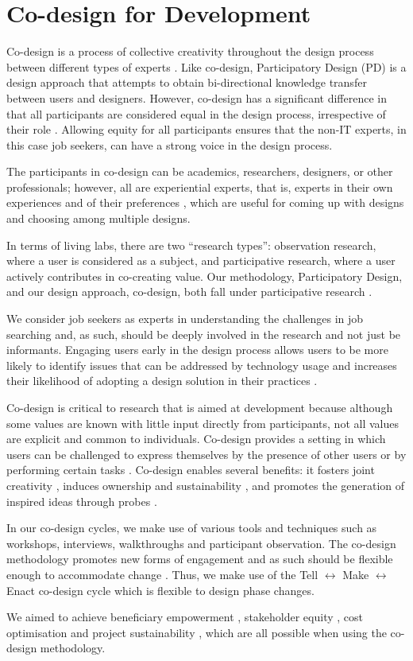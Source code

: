 \section{Co-design for Development}

Co-design is a process of collective creativity throughout the design process
\cite{sanders2008} between different types of experts \cite{steen2011}.
Like co-design, Participatory Design (PD) is a design approach that attempts to obtain
bi-directional knowledge transfer between users and designers. However, co-design has a
significant difference in that all participants are considered equal in the design process,
irrespective of their role \cite{zimmerman2011}. Allowing equity for all participants
ensures that the non-IT experts, in this case job seekers, can have a strong voice in the
design process.

The participants in co-design can be academics, researchers, designers, or other
professionals; however, all are experiential experts, that is, experts in their own
experiences \cite{steen2011} and of their preferences \cite{preece2002}, which are
useful for coming up with designs and choosing among multiple designs.

In terms of living labs, there are two ``research types'': observation research, where a
user is considered as a subject, and participative research, where a user actively contributes
in co-creating value. Our methodology, Participatory Design, and our design approach,
co-design, both fall under participative research \cite{pallot2011}.

We consider job seekers as experts in understanding the challenges in job searching
and, as such, should be deeply involved in the research and not just be informants.
Engaging users early in the design process allows users to be more likely to identify issues
that can be addressed by technology usage and increases their likelihood of adopting a design
solution in their practices \cite{david2013}.

Co-design is critical to research that is aimed at development because although
some values are known with little input directly from participants, not all values are
explicit and common to individuals. Co-design provides a setting in which users
can be challenged to express themselves by the presence of other users or by performing certain tasks \cite{halloran2009}. Co-design enables several benefits: it fosters joint
creativity \cite{steen2011}, induces ownership and sustainability \cite{david2013},
and promotes the generation of inspired ideas through probes
\cite{sanders2014}.

In our co-design cycles, we make use of various tools and techniques such as workshops,
interviews, walkthroughs and participant observation. The co-design methodology promotes
new forms of engagement and as such should be flexible enough to accommodate
change \cite{sanders2008}. Thus, we make use of the Tell $\leftrightarrow$
Make $\leftrightarrow$ Enact co-design cycle which is flexible to design phase changes.

We aimed to achieve beneficiary empowerment \cite{ssozi2016},
stakeholder equity \cite{zimmerman2011}, cost optimisation \cite{steen2011}
and project sustainability \cite{david2013}, which are all possible when using the
co-design methodology.